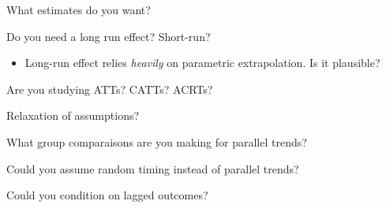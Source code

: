 \documentclass[notes,11pt, aspectratio=169]{beamer}
\newenvironment{wideitemize}{\itemize\addtolength{\itemsep}{10pt}}{\enditemize}
\begin{document}
\begin{frame}{What estimates do you want?}
  \begin{wideitemize}
  \item Do you need a long run effect? Short-run?
    \begin{itemize}
    \item Long-run effect relies \emph{heavily} on parametric
      extrapolation. Is it plausible?
    \end{itemize}
  \item Are you studying ATTs? CATTs? ACRTs?
  \end{wideitemize}
\end{frame}

\begin{frame}{Relaxation of assumptions?}
  \begin{wideitemize}
  \item What group comparaisons are you making for parallel trends?
  \item Could you assume random timing instead of parallel trends?
  \item Could you condition on lagged outcomes?
  \end{wideitemize}
\end{frame}
\end{document}
